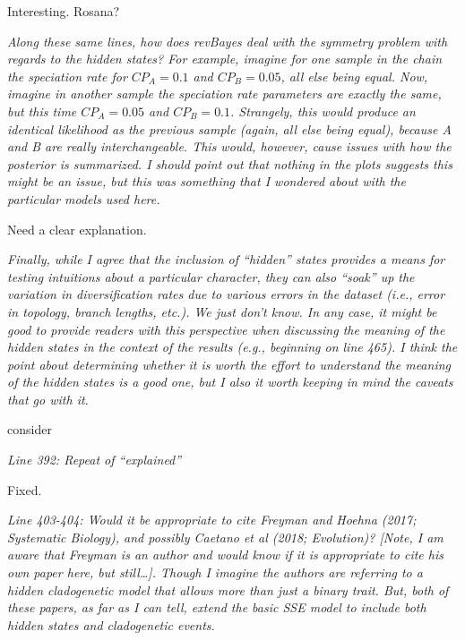 \documentclass[11pt]{article}
\renewenvironment{quote}{\bigskip\noindent\itshape\ignorespaces}{\smallskip}
\begin{document}
Interesting. Rosana? %

\begin{quote}
Along these same lines, how does revBayes deal with the symmetry problem with regards to the hidden states?
For example, imagine for one sample in the chain the speciation rate for $CP_A=0.1$ and $CP_B=0.05$, all else being equal.
Now, imagine in another sample the speciation rate parameters are exactly the same, but this time $CP_A=0.05$ and $CP_B=0.1$. 
Strangely, this would produce an identical likelihood as the previous sample (again, all else being equal), because A and B are really interchangeable.
This would, however, cause issues with how the posterior is summarized.
I should point out that nothing in the plots suggests this might be an issue, but this was something that I wondered about with the particular models used here.
\end{quote}

Need a clear explanation. %

\begin{quote}
Finally, while I agree that the inclusion of ``hidden'' states provides a means for testing intuitions about a particular character, they can also ``soak'' up the variation in diversification rates due to various errors in the dataset (i.e., error in topology, branch lengths, etc.).
We just don't know.
In any case, it might be good to provide readers with this perspective when discussing the meaning of the hidden states in the context of the results (e.g., beginning on line 465).
I think the point about determining whether it is worth the effort to understand the meaning of the hidden states is a good one, but I also it worth keeping in mind the caveats that go with it.
\end{quote}

consider %


\begin{quote}
Line 392: Repeat of ``explained''
\end{quote}

Fixed. %

\begin{quote}
Line 403-404: Would it be appropriate to cite Freyman and Hoehna (2017; Systematic Biology), and possibly Caetano et al (2018; Evolution)?
[Note, I am aware that Freyman is an author and would know if it is appropriate to cite his own paper here, but still\ldots]. 
Though I imagine the authors are referring to a hidden cladogenetic model that allows more than just a binary trait.
But, both of these papers, as far as I can tell, extend the basic SSE model to include both hidden states and cladogenetic events.
\end{quote}
\end{document}

